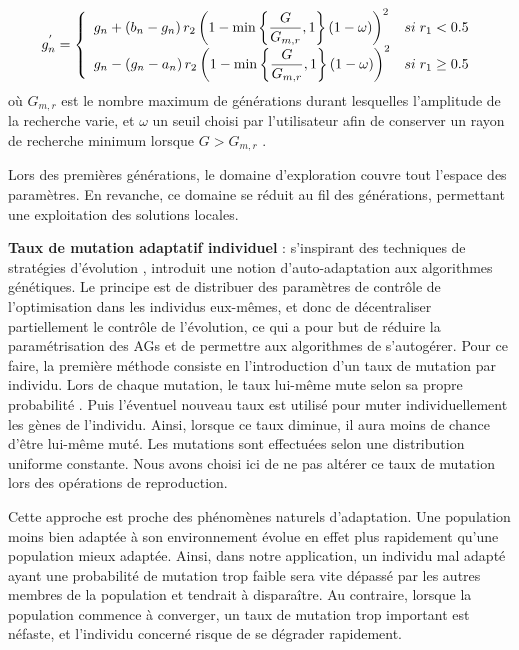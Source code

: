 \documentclass{ametsoc}
\begin{document}
	\begin{equation}
	g_{n}^{'} = 
	\left\lbrace \begin{array}{l l} 
	g_{n} + \left(b_{n}-g_{n}\right) r_{2} \left(1 - \min \left\lbrace \dfrac{G}{G_{m,r}}, 1 \right\rbrace \left(1-\omega\right) \right)^{2} & si \; r_{1} < 0.5 \\
	g_{n} - \left(g_{n}-a_{n}\right) r_{2} \left(1 - \min \left\lbrace \dfrac{G}{G_{m,r}}, 1 \right\rbrace \left(1-\omega\right) \right)^{2} & si \; r_{1} \geq 0.5 \\
	\end{array} \right.
	\label{equation_mutation_nonuniform}
	\end{equation}
	\noindent
	où $G_{m,r}$ est le nombre maximum de générations durant lesquelles l'amplitude de la recherche varie, et $\omega$ un seuil choisi par l'utilisateur afin de conserver un rayon de recherche minimum lorsque $G>G_{m,r}$ .
	
	Lors des premières générations, le domaine d'exploration couvre tout l'espace des paramètres. En revanche, ce domaine se réduit au fil des générations, permettant une exploitation des solutions locales.
	
	
	\item \textbf{Taux de mutation adaptatif individuel} \citep[\textit{adaptative mutation rate},][]{Back1992}: s'inspirant des techniques de stratégies d'évolution \citep[\textit{Evolution Strategies}, voir][]{Rechenberg1973, Schwefel1981}, \citet{Back1992} introduit une notion d'auto-adaptation aux algorithmes génétiques. Le principe est de distribuer des paramètres de contrôle de l'optimisation dans les individus eux-mêmes, et donc de décentraliser partiellement le contrôle de l'évolution, ce qui a pour but de réduire la paramétrisation des AGs et de permettre aux algorithmes de s'autogérer. Pour ce faire, la première méthode consiste en l'introduction d'un taux de mutation par individu. Lors de chaque mutation, le taux lui-même mute selon sa propre probabilité \citep{Back1992}. Puis l'éventuel nouveau taux est utilisé pour muter individuellement les gènes de l'individu. Ainsi, lorsque ce taux diminue, il aura moins de chance d'être lui-même muté. Les mutations sont effectuées selon une distribution uniforme constante. Nous avons choisi ici de ne pas altérer ce taux de mutation lors des opérations de reproduction.
	
	Cette approche est proche des phénomènes naturels d'adaptation. Une population moins bien adaptée à son environnement évolue en effet plus rapidement qu'une population mieux adaptée. Ainsi, dans notre application, un individu mal adapté ayant une probabilité de mutation trop faible sera vite dépassé par les autres membres de la population et tendrait à disparaître. Au contraire, lorsque la population commence à converger, un taux de mutation trop important est néfaste, et l'individu concerné risque de se dégrader rapidement.
	
\end{document}
